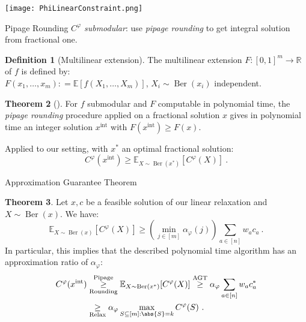 \documentclass{beamer}
\theoremstyle{definition}
\newtheorem{theo}{Theorem}[section]
\newtheorem{defi}[theo]{Definition}
\theoremstyle{remark}
\DeclareMathOperator{\Ber}{\text{Ber}}
\begin{document}
\begin{frame}
  \begin{center}
    \texttt{[image: PhiLinearConstraint.png]}
  \end{center}
\end{frame}

\begin{frame}{Pipage Rounding}
  $C^{\varphi}$ \emph{submodular}: use \emph{pipage rounding} to get integral solution from fractional one.

  \pause
  
  \begin{defi}[Multilinear extension]
    The multilinear extension $F : [0, 1]^m \rightarrow \mathbb{R}$ of $f$ is defined by:\\
    $F(x_1,\ldots,x_m): = \mathbb{E}[f(X_1,\ldots,X_m)]$, $X_i \sim \Ber(x_i)$ independent.
  \end{defi}

  \begin{theo}[\cite{AS04, Vondrak07}]
    For $f$ submodular and $F$ computable in polynomial time, the \emph{pipage rounding} procedure applied on a fractional solution $x$ gives in polynomial time an integer solution $x^{\text{int}}$ with $F(x^{\text{int}}) \geq F(x)$.
  \end{theo}

  \bigskip
  \pause
  
  Applied to our setting, with $x^*$ an optimal fractional solution:
  \[C^{\varphi}(x^{\text{int}}) \geq \mathbb{E}_{X \sim \Ber(x^*)}[C^{\varphi}(X)]\ .\]
\end{frame}

\begin{frame}{Approximation Guarantee Theorem}
  \begin{theo}
      Let $x,c$ be a feasible solution of our linear relaxation and $X \sim \Ber(x)$. We have:
      \[\mathbb{E}_{X \sim \Ber(x)}[C^{\varphi}(X)] \geq \left(\min_{j \in [m]} \alpha_{\varphi}(j)\right) \sum_{a \in [n]} w_ac_a\ .\]
  In particular, this implies that the described polynomial time algorithm has an approximation ratio of $\alpha_{\varphi}$:
  \begin{align*}
    C^{\varphi}(x^{\text{int}}) &\underset{\text{Rounding}}{\overset{\text{Pipage}}{\geq}} \mathbb{E}_{X \sim \Ber(x^*)}[C^{\varphi}(X)]  \overset{\text{AGT}}{\geq} \alpha_{\varphi} \sum_{a \in [n]} w_ac^*_a\\
    &\underset{\text{Relax}}{\geq} \alpha_{\varphi} \max_{S \subseteq [m] : \abs{S} = k} C^{\varphi}(S)\ .
  \end{align*}
  \end{theo}
\end{frame}
\end{document}
